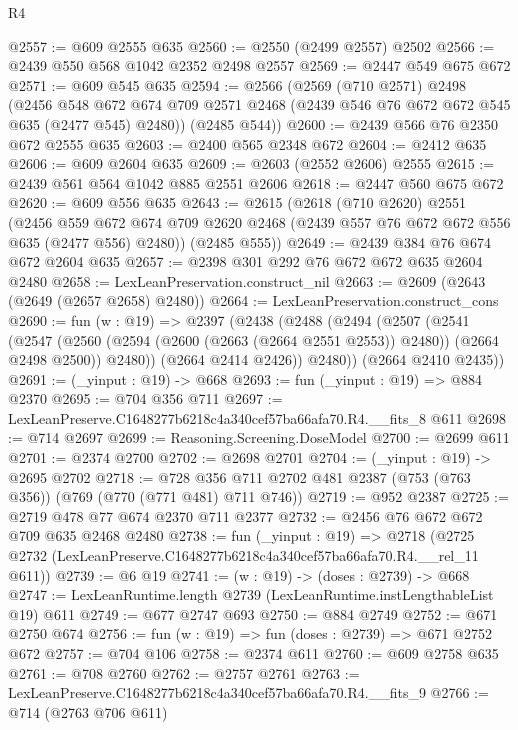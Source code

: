 \begin{lexlean}{R4}
\begin{coremodule}
@2557 := @609 @2555 @635
@2560 := @2550 (@2499 @2557) @2502
@2566 := @2439 @550 @568 @1042 @2352 @2498 @2557
@2569 := @2447 @549 @675 @672
@2571 := @609 @545 @635
@2594 := @2566
    (@2569
      (@710 @2571)
      @2498
      (@2456
        @548
        @672
        @674
        @709
        @2571
        @2468
        (@2439 @546 @76 @672 @672 @545 @635 (@2477 @545) @2480))
      (@2485 @544))
@2600 := @2439 @566 @76 @2350 @672 @2555 @635
@2603 := @2400 @565 @2348 @672
@2604 := @2412 @635
@2606 := @609 @2604 @635
@2609 := @2603 (@2552 @2606) @2555
@2615 := @2439 @561 @564 @1042 @885 @2551 @2606
@2618 := @2447 @560 @675 @672
@2620 := @609 @556 @635
@2643 := @2615
    (@2618
      (@710 @2620)
      @2551
      (@2456
        @559
        @672
        @674
        @709
        @2620
        @2468
        (@2439 @557 @76 @672 @672 @556 @635 (@2477 @556) @2480))
      (@2485 @555))
@2649 := @2439 @384 @76 @674 @672 @2604 @635
@2657 := @2398 @301 @292 @76 @672 @672 @635 @2604 @2480
@2658 := LexLeanPreservation.construct_nil
@2663 := @2609 (@2643 (@2649 (@2657 @2658) @2480))
@2664 := LexLeanPreservation.construct_cons
@2690 := fun (w : @19) =>
  @2397
    (@2438
      (@2488
        (@2494
          (@2507
            (@2541
              (@2547
                (@2560 (@2594 (@2600 (@2663 (@2664 @2551 @2553)) @2480)) (@2664 @2498 @2500))
                @2480))
            (@2664 @2414 @2426))
          @2480))
      (@2664 @2410 @2435))
@2691 := (_yinput : @19) -> @668
@2693 := fun (_yinput : @19) => @884 @2370
@2695 := @704 @356 @711
@2697 := LexLeanPreserve.C1648277b6218c4a340cef57ba66afa70.R4.__fits_8 @611
@2698 := @714 @2697
@2699 := Reasoning.Screening.DoseModel
@2700 := @2699 @611
@2701 := @2374 @2700
@2702 := @2698 @2701
@2704 := (_yinput : @19) -> @2695 @2702
@2718 := @728 @356 @711 @2702 @481 @2387 (@753 (@763 @356)) (@769 (@770 (@771 @481) @711 @746))
@2719 := @952 @2387
@2725 := @2719 @478 @77 @674 @2370 @711 @2377
@2732 := @2456 @76 @672 @672 @709 @635 @2468 @2480
@2738 := fun (_yinput : @19) =>
  @2718 (@2725 @2732 (LexLeanPreserve.C1648277b6218c4a340cef57ba66afa70.R4.__rel_11 @611))
@2739 := @6 @19
@2741 := (w : @19) -> (doses : @2739) -> @668
@2747 := LexLeanRuntime.length @2739 (LexLeanRuntime.instLengthableList @19) @611
@2749 := @677 @2747 @693
@2750 := @884 @2749
@2752 := @671 @2750 @674
@2756 := fun (w : @19) => fun (doses : @2739) => @671 @2752 @672
@2757 := @704 @106
@2758 := @2374 @611
@2760 := @609 @2758 @635
@2761 := @708 @2760
@2762 := @2757 @2761
@2763 := LexLeanPreserve.C1648277b6218c4a340cef57ba66afa70.R4.__fits_9
@2766 := @714 (@2763 @706 @611)

\end{coremodule}
\end{lexlean}

